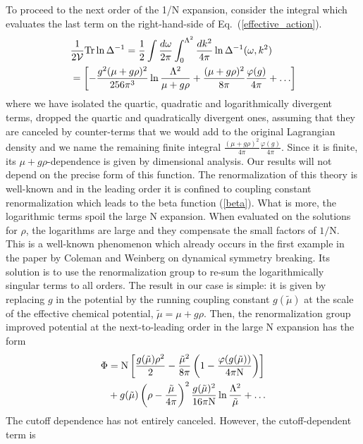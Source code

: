 \documentclass[twocolumn,secnumarabic,amssymb, nobibnotes, aps, prd]{revtex4}
\begin{document}
  To proceed to the next order of the 1/N expansion, consider the integral which evaluates the last term on the right-hand-side of
Eq.\  (\ref{effective_action}).  
 \begin{align}
& \frac{1}{2\mathcal V}{\rm Tr}\ln\Delta^{-1}=\frac{1}{2}  \int \frac{d\omega}{2\pi}\int_0^{\Lambda^2}\frac{dk^2}{4\pi}\ln \Delta^{-1}( \omega,  k^2)  
\nonumber
 \\
&= \left[ -\frac{g^2 (\mu+g\rho)^2}{256\pi^3}\ln
\frac{\Lambda^2}{\mu+g \rho}
+\frac{(\mu+ g\rho)^2}{8\pi}\frac{\varphi(g)}{4\pi}+\ldots\right]
\end{align}
where we have isolated the quartic, quadratic and logarithmically divergent terms, 
dropped the quartic and quadratically divergent ones, assuming that they are 
canceled by counter-terms that we would add to the original Lagrangian density and we name the
remaining finite integral  $\frac{( \mu+g\rho)^2}{4\pi}\frac{\varphi(g)}{4\pi}$. Since it is finite, its  $ \mu+g\rho$-dependence is
given by dimensional analysis.  Our results will not depend on the precise form of this function. 
The renormalization of this theory  is well-known and in the leading order it is confined to
coupling constant renormalization which leads to the beta function (\ref{beta}).    What is more, the logarithmic terms spoil the
large N expansion.  When evaluated on the solutions for $\rho$,  the logarithms are large and they compensate the small factors of $1/$N.  
This is a well-known phenomenon
which already occurs in the first example in the paper by Coleman and Weinberg \cite{Coleman} on dynamical symmetry breaking.  Its solution
is to use the renormalization group to re-sum the logarithmically singular terms to all orders.  The result in our case is simple: it is given by replacing  
  $g$ in the potential by the running coupling constant $g(\tilde\mu )$ at the scale of the effective chemical potential, $\tilde\mu=\mu+g\rho$. 
Then, the renormalization group improved potential at the next-to-leading order in the large N expansion has the form
 \begin{align}
\Phi &= {\rm N}  \left[ \frac{g(\tilde\mu )\rho^2}{2}  -\frac{\tilde\mu^2  } {8\pi}\left(1-\frac{\varphi(g(\tilde\mu ))}{4\pi\rm N}\right)  \right] 
\nonumber \\
&+g(\tilde\mu )\left(\rho-\frac{\tilde\mu }{4\pi}\right)^2\frac{g(\tilde\mu)^2}{16\pi {\rm N}}\ln\frac{\Lambda^2}{\tilde\mu }
 +\ldots 
\label{final} \end{align} 
 The cutoff dependence has not entirely canceled.  However, the  cutoff-dependent term is
\end{document}
